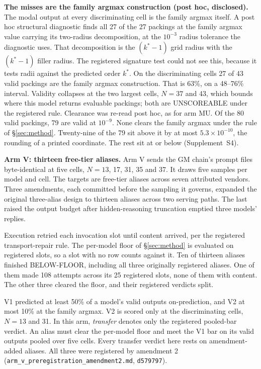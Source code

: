 \textbf{The misses are the family argmax construction (post hoc, disclosed).} The modal
output at every discriminating cell is the family argmax itself. A post hoc structural diagnostic finds all 27 of the 27 packings at the family
argmax value carrying its two-radius decomposition, at the $10^{-3}$ radius tolerance the
diagnostic uses. That
decomposition is the $(k^*{-}1)$ grid radius with the $(k^*{-}1)$ filler radius. The
registered signature test could not see this, because it tests radii against the predicted
order $k^*$. On the discriminating cells 27 of 43 valid packings are the family argmax
construction. That is 63\%, on a 48--76\% interval. Validity collapses at the two largest
cells, $N = 37$ and 43, which bounds where this model returns evaluable packings; both are
UNSCOREABLE under the registered rule. Clearance was re-read post hoc,
as for arm MU. Of the 80 valid packings, 79 are valid at $10^{-9}$. None clears the family
argmax under the rule of \S\ref{sec:method}. Twenty-nine of the 79 sit above it by at most
$5.3\times10^{-10}$, the rounding of a printed coordinate. The rest sit at or below
(Supplement~S4).

\textbf{Arm V: thirteen free-tier aliases.} Arm V sends the GM chain's prompt files
byte-identical at five cells, $N = 13$, 17, 31, 35 and 37. It draws five samples per model and
cell. The targets are free-tier aliases across seven attributed vendors. Three amendments,
each committed before the sampling it
governs, expanded the original three-alias design to thirteen aliases across two serving
paths. The last raised the output budget after hidden-reasoning truncation emptied three
models' replies.

Execution retried each invocation slot until content arrived, per the registered
transport-repair rule. The per-model floor of \S\ref{sec:method} is evaluated on registered
slots, so a slot with no row counts against it. Ten of thirteen aliases finished BELOW-FLOOR,
including all three originally registered aliases. One of them made 108 attempts across its 25
registered slots, none of them with content. The other three cleared the floor, and their
registered verdicts split.

V1 predicted at least 50\% of a model's valid outputs on-prediction, and V2 at most 10\% at
the family argmax. V2 is scored only at the discriminating cells, $N = 13$ and 31. In this
arm, \emph{transfer} denotes only the registered pooled-bar verdict. An alias must clear the
per-model floor and meet the V1 bar on its valid outputs pooled over five cells. Every transfer
verdict here rests on amendment-added aliases. All three were registered by amendment 2
(\texttt{arm\_v\_\bk{}preregistration\_\bk{}amendment2.md}, \texttt{d579797}).

